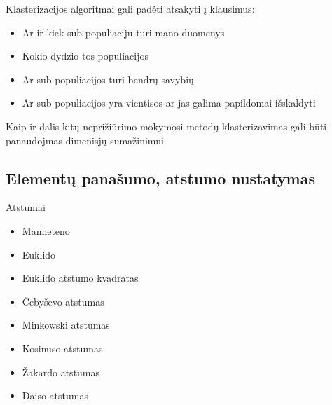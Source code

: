 \documentclass{VUMIFInfKursinis}
\begin{document}
Klasterizacijos algoritmai gali padėti atsakyti į klausimus:
\begin{itemize}
	\item Ar ir kiek sub-populiaciju turi mano duomenys
	\item Kokio dydzio tos populiacijos
	\item Ar sub-populiacijos turi bendrų savybių
	\item Ar sub-populiacijos yra vientisos ar jas galima papildomai išskaldyti
\end{itemize}
Kaip ir dalis kitų neprižiūrimo mokymosi metodų klasterizavimas gali būti panaudojmas dimenisjų sumažinimui. 
\subsection{Elementų panašumo, atstumo nustatymas}
Atstumai
\begin{itemize}
	\item Manheteno
	\item Euklido
	\item Euklido atstumo kvadratas
	\item Čebyševo atstumas 
	\item Minkowski atstumas 
	\item Kosinuso atstumas 
	\item Žakardo atstumas 
	\item Daiso atstumas 
\end{itemize}
\end{document}

